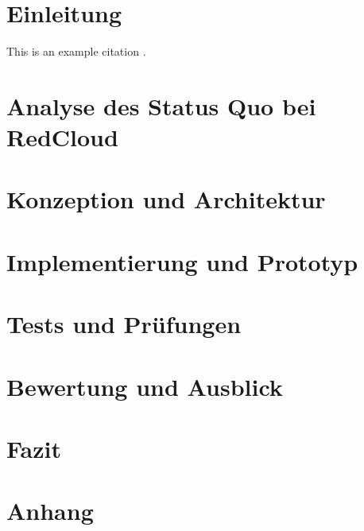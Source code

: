 \documentclass{article}
\begin{document}
\tableofcontents 
\newpage

\section{Einleitung}
This is an example citation \cite{example}.


\section{Analyse des Status Quo bei RedCloud}

\section{Konzeption und Architektur}

\section{Implementierung und Prototyp}

\section{Tests und Prüfungen}

\section{Bewertung und Ausblick}

\section{Fazit}

\section{Anhang}

\end{document}
